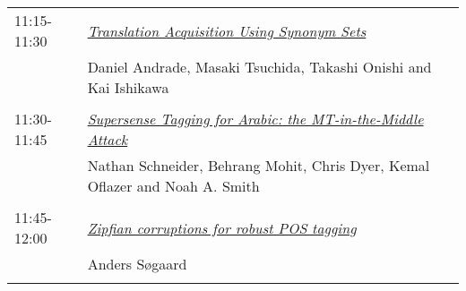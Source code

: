 \begin{tabular}{p{20mm}p{138mm}}
11:15-11:30 & \hyperlink{page.655}{\em Translation Acquisition Using Synonym Sets}\\
         & Daniel Andrade, Masaki Tsuchida, Takashi Onishi and Kai Ishikawa \\
\\

11:30-11:45 & \hyperlink{page.661}{\em Supersense Tagging for Arabic: the MT-in-the-Middle Attack}\\
         & Nathan Schneider, Behrang Mohit, Chris Dyer, Kemal Oflazer and Noah A. Smith \\
\\

11:45-12:00 & \hyperlink{page.668}{\em Zipfian corruptions for robust POS tagging}\\
         & Anders S{\o}gaard \\
\\

\end{tabular}
\newpage
